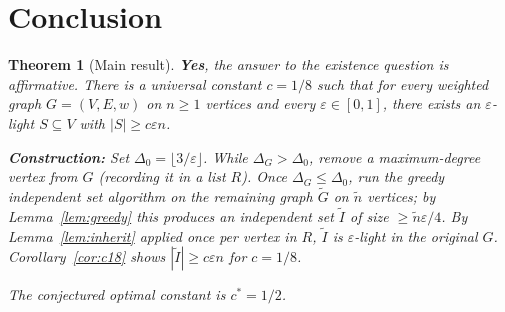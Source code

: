 \documentclass[12pt]{article}
\newtheorem{theorem}{Theorem}
\theoremstyle{definition}
\begin{document}
\section{Conclusion}

\begin{theorem}[Main result]\label{thm:final}
\textbf{Yes}, the answer to the existence question is affirmative.
There is a universal constant $c=1/8$ such that for every weighted graph
$G=(V,E,w)$ on $n\ge 1$ vertices and every $\varepsilon\in[0,1]$, there exists an
$\varepsilon$-light $S\subseteq V$ with $|S|\ge c\varepsilon n$.

\smallskip
\noindent
\textbf{Construction:} Set $\Delta_0=\lfloor 3/\varepsilon\rfloor$.
While $\Delta_G>\Delta_0$, remove a maximum-degree vertex from $G$ (recording
it in a list $R$).  Once $\Delta_G\le\Delta_0$, run the greedy independent set
algorithm on the remaining graph $\tilde G$ on $\tilde n$ vertices; by
Lemma~\ref{lem:greedy} this produces an independent set $\tilde I$ of size
$\ge\tilde n\varepsilon/4$.  By Lemma~\ref{lem:inherit} applied once per vertex in $R$,
$\tilde I$ is $\varepsilon$-light in the original $G$.
Corollary~\ref{cor:c18} shows $|\tilde I|\ge c\varepsilon n$ for $c=1/8$.

The conjectured optimal constant is $c^*=1/2$.
\end{theorem}
\end{document}
